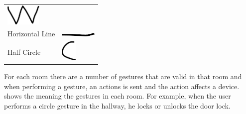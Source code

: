 \begin{table}[h!]
\begin{tabular}{ll}
\begin{minipage}{.3\textwidth}
  \includegraphics[height=1cm]{images/gesture-w}
\end{minipage}
\\[0.5cm]
Horizontal Line       &
\begin{minipage}{.3\textwidth}
  \includegraphics[width=1.75cm]{images/gesture-horizontal-line}
\end{minipage}
\\[0.5cm]
Half Circle           &                      
\begin{minipage}{.3\textwidth}
  \includegraphics[height=1cm]{images/gesture-half-circle}
\end{minipage}
\end{tabular}
\end{table}

For each room there are a number of gestures that are valid in that room and when performing a gesture, an actions is sent and the action affects a device.  shows the meaning the gestures in each room. For example, when the user performs a circle gesture in the hallway, he locks or unlocks the door lock.

